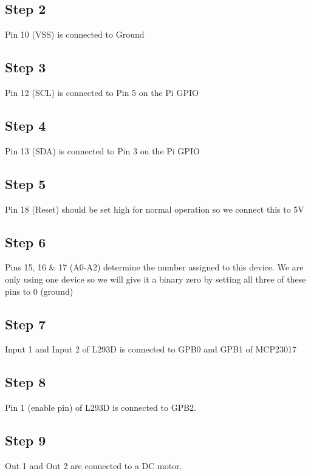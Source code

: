 \documentclass[a4paper,12pt,oneside]{book}
\begin{document}
\subsection*{Step 2}
Pin 10 (VSS) is connected to Ground
\subsection*{Step 3}
Pin 12 (SCL) is connected to Pin 5 on the Pi GPIO
\subsection*{Step 4}
Pin 13 (SDA) is connected to Pin 3 on the Pi GPIO
\subsection*{Step 5}
Pin 18 (Reset) should be set high for normal operation so we connect
this to 5V
\subsection*{Step 6}
Pins 15, 16 \& 17 (A0-A2) determine the number assigned to this device. We are only using one device so we will give it a binary zero by setting all three of these pins to 0 (ground)
\subsection*{Step 7}
Input 1 and Input 2 of L293D is connected to GPB0 and GPB1 of MCP23017
\subsection*{Step 8}
Pin 1 (enable pin) of L293D is connected to GPB2.
\subsection*{Step 9}
Out 1 and Out 2 are connected to a DC motor.
\end{document}
